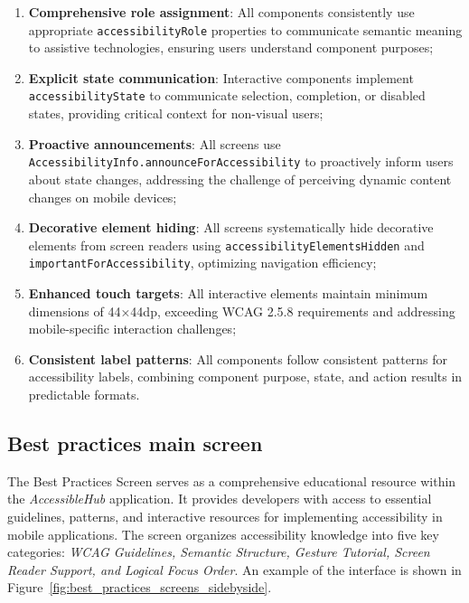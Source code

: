 \begin{enumerate}
    \item \textbf{Comprehensive role assignment}: All components consistently use appropriate \texttt{accessibilityRole} properties to communicate semantic meaning to assistive technologies, ensuring users understand component purposes;
    
    \item \textbf{Explicit state communication}: Interactive components implement \texttt{accessibilityState} to communicate selection, completion, or disabled states, providing critical context for non-visual users;
    
    \item \textbf{Proactive announcements}: All screens use \texttt{AccessibilityInfo.announceForAccessibility} to proactively inform users about state changes, addressing the challenge of perceiving dynamic content changes on mobile devices;
    
    \item \textbf{Decorative element hiding}: All screens systematically hide decorative elements from screen readers using \texttt{accessibilityElementsHidden} and \texttt{importantForAccessibility}, optimizing navigation efficiency;
    
    \item \textbf{Enhanced touch targets}: All interactive elements maintain minimum dimensions of 44×44dp, exceeding WCAG 2.5.8 requirements and addressing mobile-specific interaction challenges;
    
    \item \textbf{Consistent label patterns}: All components follow consistent patterns for accessibility labels, combining component purpose, state, and action results in predictable formats.
\end{enumerate}

\subsection{Best practices main screen}

The Best Practices Screen serves as a comprehensive educational resource within the \textit{AccessibleHub} application. It provides developers with access to essential guidelines, patterns, and interactive resources for implementing accessibility in mobile applications. The screen organizes accessibility knowledge into five key categories: \textit{WCAG Guidelines, Semantic Structure, Gesture Tutorial, Screen Reader Support, and Logical Focus Order}. An example of the interface is shown in Figure~\ref{fig:best_practices_screens_sidebyside}.

